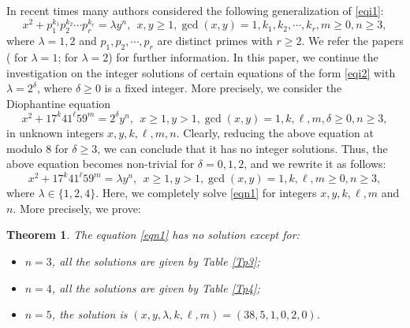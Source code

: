 \documentclass[12pt, 14paper,reqno]{amsart}
\theoremstyle{plain}
\newtheorem{thm}{Theorem}[section]
\theoremstyle{proof}
\numberwithin{equation}{section}
\begin{document}
In recent times many authors considered the following generalization of \eqref{eqi1}:
\begin{equation}\label{eqi2}
x^2+p_1^{k_1}p_2^{k_2}\cdots p_r^{k_r}=\lambda y^n,~~ x,y\geq 1, \gcd(x,y)=1, k_1, k_2,\cdots, k_r, m\geq 0, n\geq 3,
\end{equation}
where $\lambda=1,2$ and $p_1, p_2, \cdots, p_r$ are distinct primes with $r\geq 2$. We refer the papers (\cite{CHS21b, DE17,LT09, AL08, PI07, ZL15} for $\lambda=1$; \cite{APA2024, AL09, PI04} for $\lambda=2$) for further information. In this paper, we continue the investigation on the integer solutions of certain equations of the form  \eqref{eqi2} with $\lambda=2^\delta$, where $\delta\geq 0$ is a fixed integer. More precisely, we consider the Diophantine equation 
$$x^2+17^k41^\ell 59^m =2^\delta y^n,~~x\geq 1, y>1, \gcd(x,y)=1, k, \ell, m, \delta\geq 0, n\geq 3,$$
in unknown integers $x,y,k,\ell, m,n$. Clearly, reducing the above equation at modulo $8$ for $\delta\geq 3$, we can conclude that it has no integer solutions. Thus, the above equation becomes non-trivial for $\delta=0,1,2$, and we rewrite it as follows:
\begin{equation}\label{eqn1}
x^2+17^k41^\ell 59^m =\lambda y^n,~~x\geq 1, y>1, \gcd(x,y)=1, k, \ell, m\geq 0, n\geq 3,
\end{equation}
where $\lambda\in \{1,2, 4\}$. Here, we completely solve \eqref{eqn1} for integers $x,y,k, \ell, m$ and $n$. More precisely, we prove:
\begin{thm}\label{thm}
The equation \eqref{eqn1} has no solution except for:  
\begin{itemize}
\item[(i)] $n=3$, all the solutions are given by Table \ref{Tp3};
\item[(ii)] $n=4$, all the solutions are given by Table \ref{Tp4};%
\item[(iii)] $n=5$, the solution is $(x,y,\lambda,k,\ell,m)=(38,5,1,0,2,0)$.
\end{itemize}
\end{thm}
\end{document}
